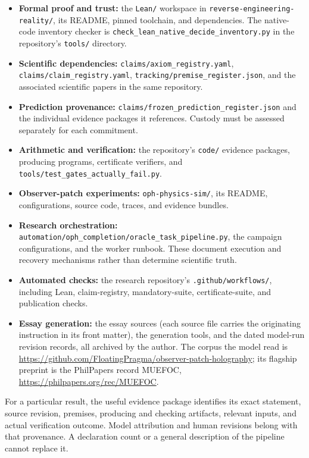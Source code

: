 \documentclass[
  11pt,
]{article}
\providecommand{\tightlist}{%
  \setlength{\itemsep}{0pt}\setlength{\parskip}{0pt}}
\begin{document}
\begin{itemize}
\tightlist
\item
  \textbf{Formal proof and trust:} the \texttt{Lean/} workspace in
  \texttt{reverse-engineering-reality/}, its README, pinned toolchain,
  and dependencies. The native-code inventory checker is
  \texttt{check\_lean\_native\_decide\_inventory.py} in the repository's
  \texttt{tools/} directory.
\item
  \textbf{Scientific dependencies:}
  \texttt{claims/axiom\_registry.yaml},
  \texttt{claims/claim\_registry.yaml},
  \texttt{tracking/premise\_register.json}, and the associated
  scientific papers in the same repository.
\item
  \textbf{Prediction provenance:}
  \texttt{claims/frozen\_prediction\_register.json} and the individual
  evidence packages it references. Custody must be assessed separately
  for each commitment.
\item
  \textbf{Arithmetic and verification:} the repository's \texttt{code/}
  evidence packages, producing programs, certificate verifiers, and
  \texttt{tools/test\_gates\_actually\_fail.py}.
\item
  \textbf{Observer-patch experiments:} \texttt{oph-physics-sim/}, its
  README, configurations, source code, traces, and evidence bundles.
\item
  \textbf{Research orchestration:}
  \texttt{automation/oph\_completion/oracle\_task\_pipeline.py}, the
  campaign configurations, and the worker runbook. These document
  execution and recovery mechanisms rather than determine scientific
  truth.
\item
  \textbf{Automated checks:} the research repository's
  \texttt{.github/workflows/}, including Lean, claim-registry,
  mandatory-suite, certificate-suite, and publication checks.
\item
  \textbf{Essay generation:} the essay sources (each source file carries
  the originating instruction in its front matter), the generation tools,
  and the dated model-run revision records, all archived by the author. The corpus the model read
  is \url{https://github.com/FloatingPragma/observer-patch-holography}; its
  flagship preprint is the PhilPapers record MUEFOC,
  \url{https://philpapers.org/rec/MUEFOC}.
\end{itemize}

For a particular result, the useful evidence package identifies its
exact statement, source revision, premises, producing and checking
artifacts, relevant inputs, and actual verification outcome. Model
attribution and human revisions belong with that provenance. A
declaration count or a general description of the pipeline cannot
replace it.
\end{document}

